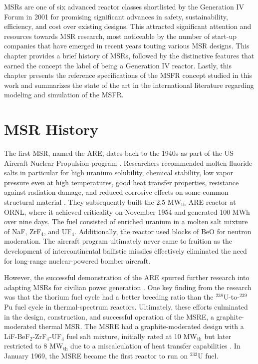 \glspl{MSR} are one of six advanced reactor classes shortlisted by
the Generation IV Forum in 2001 for promising significant advances in safety,
sustainability, efficiency, and cost over existing designs. This
attracted significant attention and resources towards
\gls{MSR} research, most noticeable by the number of start-up companies that
have emerged in recent years touting various \gls{MSR} designs. This chapter
provides a brief history of \glspl{MSR}, followed by the distinctive features
that earned the concept the label of being a Generation IV reactor. Lastly,
this chapter presents the reference specifications of the \gls{MSFR} concept
studied in this work and summarizes the state of the art in the international
literature regarding modeling and simulation of the \gls{MSFR}.

\section{\gls{MSR} History}

The first \gls{MSR}, named the \gls{ARE}, dates back to the 1940s
as part of the US Aircraft Nuclear Propulsion program
\cite{rosenthal_molten-salt_1970}. Researchers recommended molten fluoride
salts in particular for high uranium solubility, chemical stability, low vapor
pressure even at high temperatures, good heat transfer properties,
resistance against radiation damage, and reduced corrosive effects on some
common structural material \cite{rosenthal_molten-salt_1970}. They
subsequently built the 2.5 MW$_{\text{th}}$ ARE reactor at \gls{ORNL}, where
it achieved criticality on November 1954 and generated 100 MWh over nine days.
The fuel consisted of enriched uranium in a molten salt mixture of NaF,
ZrF$_4$, and UF$_4$. Additionally, the reactor used blocks of BeO for neutron
moderation. The aircraft program
ultimately never came to fruition as the development of intercontinental
ballistic missiles effectively eliminated the need for long-range
nuclear-powered bomber aircraft.

However, the successful demonstration of the \gls{ARE} spurred further
research into adapting \glspl{MSR} for civilian power generation
\cite{rosenthal_molten-salt_1970}. One key finding from the
research was that the thorium fuel cycle had a better breeding ratio than the
$^{238}$U-to-$^{239}$Pu fuel cycle in thermal-spectrum reactors.
Ultimately, these efforts culminated in the design, construction, and
successful operation of the \gls{MSRE}, a graphite-moderated thermal
\gls{MSR}. The \gls{MSRE} had a
graphite-moderated design with a LiF-BeF$_2$-ZrF$_4$-UF$_4$ fuel salt mixture,
initially rated at 10 MW$_{\text{th}}$ but later restricted to 8
MW$_{\text{th}}$ due to a miscalculation of heat transfer capabilities
\cite{haubenreich_experience_1970}. In January 1969, the \gls{MSRE} became the
first reactor to run on $^{233}$U fuel.

